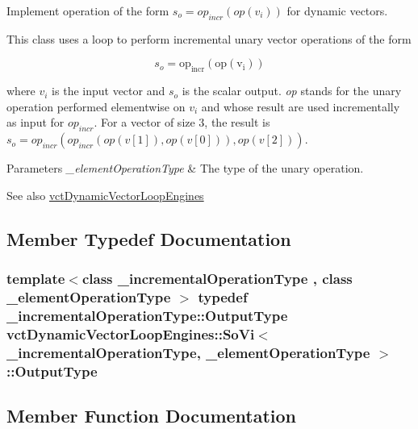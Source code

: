 Implement operation of the form $s_o = op_{incr}(op(v_i))$ for dynamic vectors. 

This class uses a loop to perform incremental unary vector operations of the form

\[ s_o = \mathrm{op_{incr}(\mathrm{op}(v_i))} \]

where $v_i$ is the input vector and $s_o$ is the scalar output. {\itshape op} stands for the unary operation performed elementwise on $v_i$ and whose result are used incrementally as input for $op_{incr}$. For a vector of size 3, the result is $s_o = op_{incr}(op_{incr}(op(v[1]), op(v[0])), op(v[2])) $.


\begin{DoxyParams}{Parameters}
{\em \+\_\+element\+Operation\+Type} & The type of the unary operation.\\
\hline
\end{DoxyParams}
\begin{DoxySeeAlso}{See also}
\hyperlink{classvct_dynamic_vector_loop_engines}{vct\+Dynamic\+Vector\+Loop\+Engines} 
\end{DoxySeeAlso}


\subsection{Member Typedef Documentation}
\hypertarget{classvct_dynamic_vector_loop_engines_1_1_so_vi_a0e42560add0a15a5c8722aee8a9aa78c}{}
\subsubsection[{Output\+Type}]{\setlength{\rightskip}{0pt plus 5cm}template$<$class \+\_\+incremental\+Operation\+Type , class \+\_\+element\+Operation\+Type $>$ typedef \+\_\+incremental\+Operation\+Type\+::\+Output\+Type {\bf vct\+Dynamic\+Vector\+Loop\+Engines\+::\+So\+Vi}$<$ \+\_\+incremental\+Operation\+Type, \+\_\+element\+Operation\+Type $>$\+::{\bf Output\+Type}}\label{classvct_dynamic_vector_loop_engines_1_1_so_vi_a0e42560add0a15a5c8722aee8a9aa78c}


\subsection{Member Function Documentation}
\hypertarget{classvct_dynamic_vector_loop_engines_1_1_so_vi_af025608cd64ae1471ffeb1ef6f842631}{}
